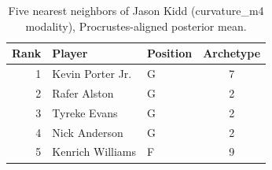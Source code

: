 \begin{table}[htbp]
  \centering\small
  \begin{tabular}{rllc}
    \toprule
    Rank & Player & Position & Archetype \\
    \midrule
    1 & Kevin Porter Jr. & G & 7 \\
    2 & Rafer Alston & G & 2 \\
    3 & Tyreke Evans & G & 2 \\
    4 & Nick Anderson & G & 2 \\
    5 & Kenrich Williams & F & 9 \\
    \bottomrule
  \end{tabular}
  \caption{Five nearest neighbors of Jason Kidd (curvature_m4 modality), Procrustes-aligned posterior mean.}
  \label{tab:Jason_Kidd_neighbors_curvature_m4}
\end{table}


